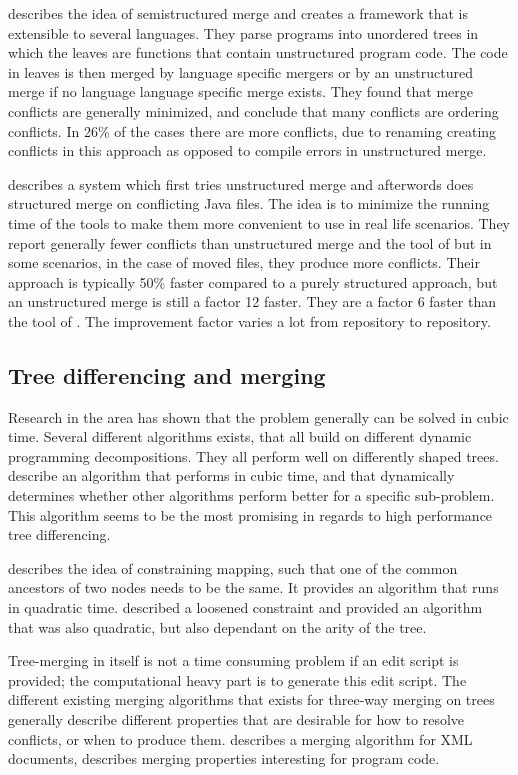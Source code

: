 \documentclass[11pt]{article}
\begin{document}
\citet{Apel} describes the idea of semistructured merge and creates a framework that is extensible to several languages. They parse programs into unordered trees in which the leaves are functions that contain unstructured program code. The code in leaves is then merged by language specific mergers or by an unstructured merge if no language language specific merge exists. They found that merge conflicts are generally minimized, and conclude that many conflicts are ordering conflicts. In 26\% of the cases there are more conflicts, due to renaming creating conflicts in this approach as opposed to compile errors in unstructured merge.

\citet{Olav} describes a system which first tries unstructured merge and afterwords does structured merge on conflicting Java files. The idea is to minimize the running time of the tools to make them more convenient to use in real life scenarios. They report generally fewer conflicts than unstructured merge and the tool of \citet{Apel} but in some scenarios, in the case of moved files, they produce more conflicts. Their approach is typically 50\% faster compared to a purely structured approach, but an unstructured merge is still a factor 12 faster. They are a factor 6 faster than the tool of \citet{Apel}. The improvement factor varies a lot from repository to repository.  

\subsection{Tree differencing and merging}
Research in the area has shown that the problem generally can be solved in cubic time. Several different algorithms exists, that all build on different dynamic programming decompositions. They all perform well on differently shaped trees. \citet{Pawlik} describe an algorithm that performs in cubic time, and that dynamically determines whether other algorithms perform better for a specific sub-problem. This algorithm seems to be the most promising in regards to high performance tree differencing.

\citet{Zhang} describes the idea of constraining mapping, such that one of the common ancestors of two nodes needs to be the same. It provides an algorithm that runs in quadratic time. \citet{Lu} described a loosened constraint and provided an algorithm that was also quadratic, but also dependant on the arity of the tree.

Tree-merging in itself is not a time consuming problem if an edit script is provided; the computational heavy part is to generate this edit script. The different existing merging algorithms that exists for three-way merging on trees generally describe different properties that are desirable for how to resolve conflicts, or when to produce them. \citet{lindholm} describes a merging algorithm for XML documents, \citet{Horwitz,Asklund,Olav} describes merging properties interesting for program code.
\end{document}
